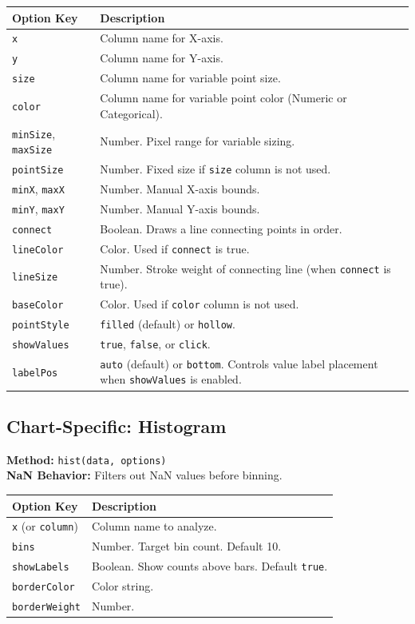 \documentclass[10pt, a4paper]{article}
\begin{document}
\begin{longtable}{p{5cm} p{10cm}}
\toprule
\textbf{Option Key} & \textbf{Description} \\
\midrule
\texttt{x} & Column name for X-axis. \\
\texttt{y} & Column name for Y-axis. \\
\texttt{size} & Column name for variable point size. \\
\texttt{color} & Column name for variable point color (Numeric or Categorical). \\
\texttt{minSize}, \texttt{maxSize} & Number. Pixel range for variable sizing. \\
\texttt{pointSize} & Number. Fixed size if \texttt{size} column is not used. \\
\texttt{minX}, \texttt{maxX} & Number. Manual X-axis bounds. \\
\texttt{minY}, \texttt{maxY} & Number. Manual Y-axis bounds. \\
\texttt{connect} & Boolean. Draws a line connecting points in order. \\
\texttt{lineColor} & Color. Used if \texttt{connect} is true. \\
\texttt{lineSize} & Number. Stroke weight of connecting line (when \texttt{connect} is true). \\
\texttt{baseColor} & Color. Used if \texttt{color} column is not used. \\
\texttt{pointStyle} & \texttt{filled} (default) or \texttt{hollow}. \\
\texttt{showValues} & \texttt{true}, \texttt{false}, or \texttt{click}. \\
\texttt{labelPos} & \texttt{auto} (default) or \texttt{bottom}. Controls value label placement when \texttt{showValues} is enabled. \\
\bottomrule
\end{longtable}

\subsection{Chart-Specific: Histogram}
\textbf{Method:} \texttt{hist(data, options)} \\
\textbf{NaN Behavior:} Filters out NaN values before binning.

\begin{longtable}{p{5cm} p{10cm}}
\toprule
\textbf{Option Key} & \textbf{Description} \\
\midrule
\texttt{x} (or \texttt{column}) & Column name to analyze. \\
\texttt{bins} & Number. Target bin count. Default 10. \\
\texttt{showLabels} & Boolean. Show counts above bars. Default \texttt{true}. \\
\texttt{borderColor} & Color string. \\
\texttt{borderWeight} & Number. \\
\bottomrule
\end{longtable}
\end{document}
